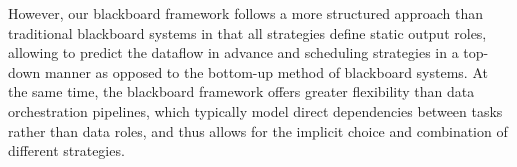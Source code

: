 However, our blackboard framework follows a more structured approach than traditional blackboard systems in that all strategies define static output roles, allowing to predict the dataflow in advance and scheduling strategies in a top-down manner as opposed to the bottom-up method of blackboard systems.
At the same time, the blackboard framework offers greater flexibility than data orchestration pipelines, which typically model direct dependencies between tasks rather than data roles, and thus allows for the implicit choice and combination of different strategies.
